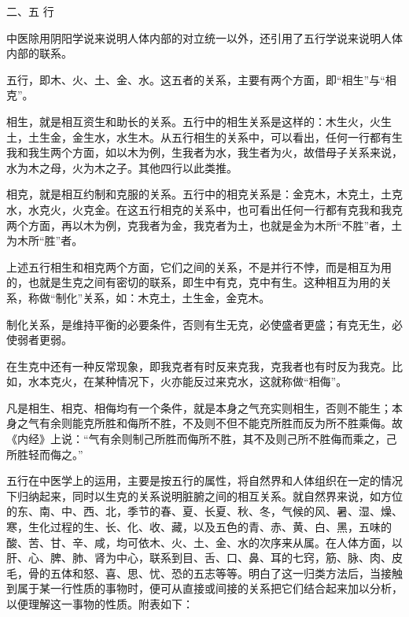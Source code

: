 \documentclass[12pt,UTF8]{ctexbook}
\begin{document}
二、五 行

中医除用阴阳学说来说明人体内部的对立统一以外，还引用了五行学说来说明人体内部的联系。

五行，即木、火、土、金、水。这五者的关系，主要有两个方面，即“相生”与“相克”。

相生，就是相互资生和助长的关系。五行中的相生关系是这样的：木生火，火生土，土生金，金生水，水生木。从五行相生的关系中，可以看出，任何一行都有生我和我生两个方面，如以木为例，生我者为水，我生者为火，故借母子关系来说，水为木之母，火为木之子。其他四行以此类推。

相克，就是相互约制和克服的关系。五行中的相克关系是：金克木，木克土，土克水，水克火，火克金。在这五行相克的关系中，也可看出任何一行都有克我和我克两个方面，再以木为例，克我者为金，我克者为土，也就是金为木所“不胜”者，土为木所“胜”者。

上述五行相生和相克两个方面，它们之间的关系，不是并行不悖，而是相互为用的，也就是生克之间有密切的联系，即生中有克，克中有生。这种相互为用的关系，称做“制化”关系，如：木克土，土生金，金克木。

制化关系，是维持平衡的必要条件，否则有生无克，必使盛者更盛；有克无生，必使弱者更弱。

在生克中还有一种反常现象，即我克者有时反来克我，克我者也有时反为我克。比如，水本克火，在某种情况下，火亦能反过来克水，这就称做“相侮”。

凡是相生、相克、相侮均有一个条件，就是本身之气充实则相生，否则不能生；本身之气有余则能克所胜和侮所不胜，不及则不但不能克所胜而反为所不胜乘侮。故《内经》上说：“气有余则制己所胜而侮所不胜，其不及则己所不胜侮而乘之，己所胜轻而侮之。”

五行在中医学上的运用，主要是按五行的属性，将自然界和人体组织在一定的情况下归纳起来，同时以生克的关系说明脏腑之间的相互关系。就自然界来说，如方位的东、南、中、西、北，季节的春、夏、长夏、秋、冬，气候的风、暑、湿、燥、寒，生化过程的生、长、化、收、藏，以及五色的青、赤、黄、白、黑，五味的酸、苦、甘、辛、咸，均可依木、火、土、金、水的次序来从属。在人体方面，以肝、心、脾、肺、肾为中心，联系到目、舌、口、鼻、耳的七窍，筋、脉、肉、皮毛，骨的五体和怒、喜、思、忧、恐的五志等等。明白了这一归类方法后，当接触到属于某一行性质的事物时，便可从直接或间接的关系把它们结合起来加以分析，以便理解这一事物的性质。附表如下：
\end{document}
